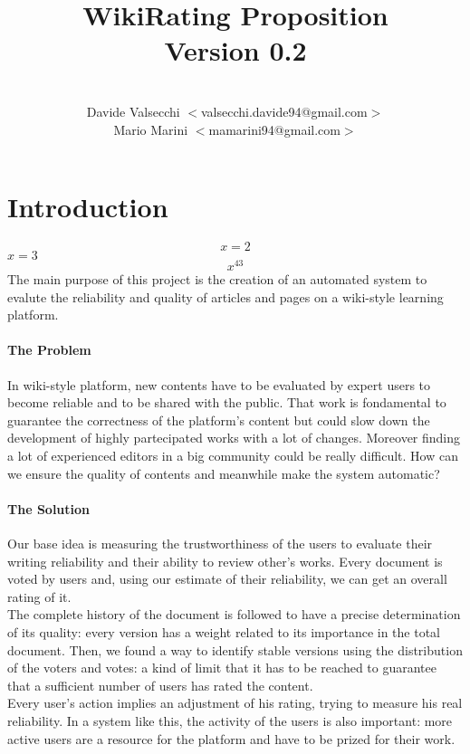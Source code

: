 \documentclass[a4paper,11pt]{article}
\title{\textbf{WikiRating Proposition\\Version 0.2}}
\author{\\Davide Valsecchi $<$valsecchi.davide94@gmail.com$>$
\\Mario Marini $<$mamarini94@gmail.com$>$}
\begin{document}
\maketitle
\newpage
\tableofcontents
\newpage

\section{Introduction}

$$x = 2$$
$x=3$
\begin{equation}
x^43
\end{equation}
The main purpose of this project is the creation of an automated system to evalute the reliability and quality of articles and pages on a wiki-style learning platform.
\paragraph{The Problem}
In wiki-style platform, new contents have to be evaluated by expert users to become reliable and to be shared with the public. That work is fondamental to guarantee the
correctness of the platform's content but could slow down the development of highly
partecipated works with a lot of changes. Moreover finding a lot of experienced editors  
in a big community could be really difficult. How can we ensure the quality of contents 
and meanwhile make the system automatic?
\paragraph{The Solution}
Our base idea is measuring the trustworthiness of the users to evaluate their writing reliability and their ability to review other's works. Every document is voted by users and, using our estimate of their reliability, we can get an overall rating of it. 
\\The complete history of the document is followed to have a precise determination of its quality: every version has a weight related to its importance in the total document. Then, we found a way to identify stable versions using the distribution of the voters and votes: a kind of limit that it has to be reached to guarantee that a sufficient number of users has rated the content. 
\\Every user's action implies an adjustment of his rating, trying to measure his real reliability. In a system like this, the activity of the users is also important: more active users are a resource for the platform and have to be prized for their work.
\end{document}
